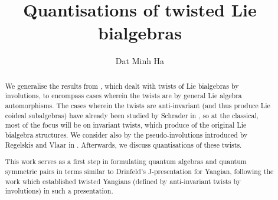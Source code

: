 

\setcounter{section}{-1}





	\title{Quantisations of twisted Lie bialgebras}
	
	\author{Dat Minh Ha}
	\maketitle
	
	\begin{abstract}
	    We generalise the results from \cite{belliard_crampe_coideal_subalgebras_from_twisted_manin_triples}, which dealt with twists of Lie bialgebras by involutions, to encompass cases wherein the twists are by general Lie algebra automorphisms. The cases wherein the twists are anti-invariant (and thus produce Lie coideal subalgebras) have already been studied by Schrader in \cite{schrader_integrable_systems_from_classical_reflection_equations}, so at the classical, most of the focus will be on invariant twists, which produce  of the original Lie bialgebra structures. We consider also  by the pseudo-involutions introduced by Regelskis and Vlaar in \cite{regelskis_vlaar_kac_moody_pseudo_symmetric_pairs}. Afterwards, we discuss quantisations of these twists.
        
        This work serves as a first step in formulating quantum algebras and quantum symmetric pairs in terms similar to Drinfeld's J-presentation for Yangian, following the work \cite{belliard_regelskis_J_presentation_for_twisted_yangians} which established twisted Yangians (defined by anti-invariant twists by involutions) in such a presentation.
	\end{abstract}
	
	{
      \hypersetup{} 
      \tableofcontents %
    }

    \listoftodos

    

    

    

    

